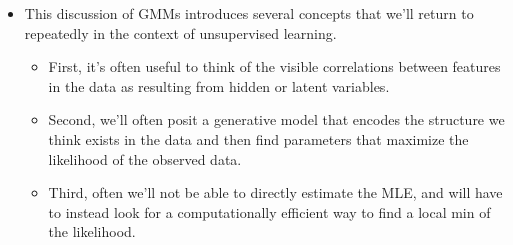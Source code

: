 \documentclass[norsk,a4paper,11pt]{article}
\begin{document}
\begin{itemize}
\begin{itemize}
	\end{itemize}
	\item This discussion of GMMs introduces several concepts that we'll return to repeatedly in the context of unsupervised learning.
	\begin{itemize}
		\item First, it's often useful to think of the visible correlations between features in the data as resulting from hidden or latent variables.
		\item Second, we'll often posit a generative model that encodes the structure we think exists in the data and then find parameters that maximize the likelihood of the observed data.
		\item Third, often we'll not be able to directly estimate the MLE, and will have to instead look for a computationally efficient way to find a local min of the likelihood.
	\end{itemize}
\end{itemize}
\end{document}
